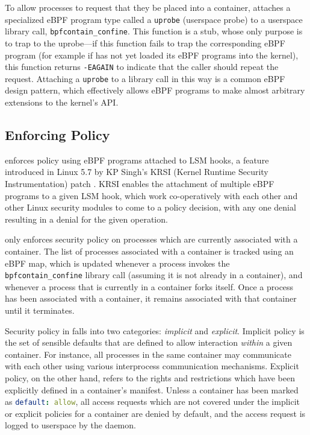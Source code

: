 To allow processes to request that they be placed into a container,
\bpfcontain{} attaches a specialized eBPF program type called a \texttt{uprobe}
(userspace probe) to a userspace library call, \texttt{bpfcontain\_confine}.
This function is a stub, whose only purpose is to trap to the uprobe---if this
function fails to trap the corresponding eBPF program (for example if
\bpfcontain{} has not yet loaded its eBPF programs into the kernel), this
function returns \texttt{-EAGAIN} to indicate that the caller should repeat the
request. Attaching a \texttt{uprobe} to a library call in this way is a common
eBPF design pattern, which effectively allows eBPF programs to make almost
arbitrary extensions to the kernel's API.

\subsection{Enforcing Policy}
\label{subsection:enforcing}

\bpfcontain{} enforces policy using eBPF programs attached to LSM hooks,
a feature introduced in Linux 5.7 by KP Singh's KRSI (Kernel Runtime Security
Instrumentation) patch \cite{singh2019_krsi,corbet2019_krsi}. KRSI enables the
attachment of multiple eBPF programs to a given LSM hook, which work
co-operatively with each other and other Linux security modules to come to
a policy decision, with any one denial resulting in a denial for the given
operation.

\bpfcontain{} only enforces security policy on processes which are currently
associated with a container. The list of processes associated with a container
is tracked using an eBPF map, which is updated whenever a process invokes the
\texttt{bpfcontain\_confine} library call (assuming it is not already in
a container), and whenever a process that is currently in a container forks
itself. Once a process has been associated with a container, it remains
associated with that container until it terminates.

Security policy in \bpfcontain{} falls into two categories: \textit{implicit}
and \textit{explicit}.  Implicit policy is the set of sensible defaults that are
defined to allow interaction \textit{within} a given container. For instance,
all processes in the same container may communicate with each other using
various interprocess communication mechanisms. Explicit policy, on the other
hand, refers to the rights and restrictions which have been explicitly defined
in a container's manifest. Unless a container has been marked as
\lstinline[language=yaml]|default: allow|, all access requests which are not
covered under the implicit or explicit policies for a container are denied by
default, and the access request is logged to userspace by the \bpfcontain{}
daemon.

